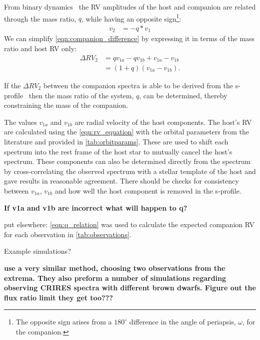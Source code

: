 From binary dynamics~\citep[e.g.][]{murray_keplerian_2010} the {RV} amplitudes of the host and companion are related through the mass ratio, \(q\), while having an opposite sign\footnote{The opposite sign arises from a \(180^\circ\) difference in the angle of periapsis, \(\omega\), for the companion.}:
\begin{align}
v_{2} &= -q * v_{1} \label{eqn:q_relation}
\end{align}
We can simplify \cref{eqn:companion_difference} by expressing it in terms of the mass ratio and host {RV} only:
\begin{align}
\Delta RV_2 &= q v_{1a} - q v_{1b} + v_{1a} - v_{1b} \nonumber \\
&= (1 + q)(v_{1a} - v_{1b}). \label{eqn:companion_difference_simplified}
\end{align}

If the \(\Delta {RV}_2\) between the companion spectra is able to be derived from the s-profile~\citep[see][]{ferluga_separating_1997} then the mass ratio of the system, \(q\), can be determined, thereby constraining the mass of the companion.

The values \(v_{1a}\) and \(v_{1b}\) are radial velocity of the host components.
The host's RV are calculated using the \cref{eqn:rv_equation} with the orbital parameters from the literature and provided in \cref{tab:orbitparams}.
These are used to shift each spectrum into the rest frame of the host star to mutually cancel the host's spectrum.
These components can also be determined directly from the spectrum by cross-correlating the observed spectrum with a stellar template of the host and gave results in reasonable agreement.
There should be checks for consistency between \(v_{1a}\), \(v_{1b}\) and how well the host component is removed in the s-profile.

\textbf{If v1a and v1b are incorrect what will happen to q?}

{\red{} put elsewhere: \cref{eqn:q_relation} was used to calculate the expected companion {RV} for each observation in \cref{tab:observations}.}

Example simulations?

\textbf{\citet{kostogryz_spectral_2013} use a very similar method, choosing two observations from the extrema.
They also preform a number of simulations regarding observing {CRIRES} spectra with different brown dwarfs.
Figure out the flux ratio limit they get too???}

